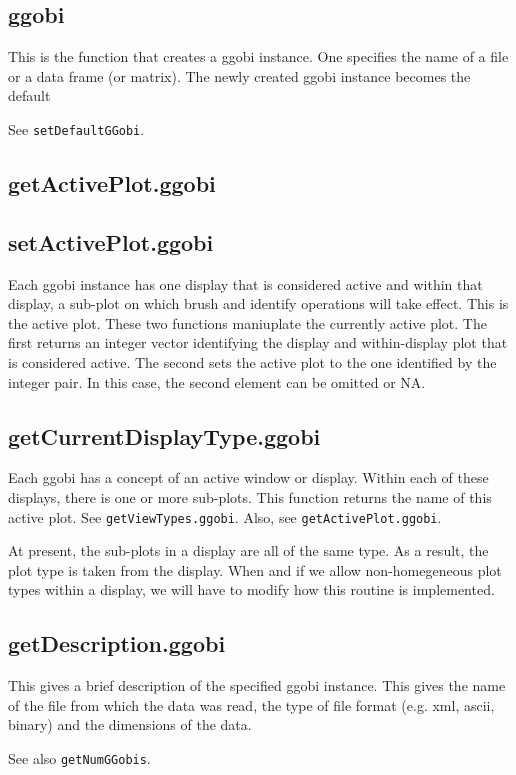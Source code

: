 \documentclass{article}
\def\SFunction#1{{\texttt{\red #1}}}
\begin{document}
\subsection{ggobi}
This is the function that creates a ggobi instance.
One specifies the name of a file or a data frame (or matrix).
The newly created ggobi instance becomes the default

See \SFunction{setDefaultGGobi}.


\subsection{getActivePlot.ggobi}
\subsection{setActivePlot.ggobi}
Each ggobi instance has one display that is considered active and
within that display, a sub-plot on which brush and identify operations
will take effect.  This is the active plot.  These two functions
maniuplate the currently active plot.  The first returns an integer
vector identifying the display and within-display plot that is
considered active.  The second sets the active plot to the one
identified by the integer pair.  In this case, the second element can
be omitted or NA.


\subsection{getCurrentDisplayType.ggobi}
Each ggobi has a concept of an active window or display. Within each
of these displays, there is one or more sub-plots.  This function
returns the name of this active plot.  See
\SFunction{getViewTypes.ggobi}.  Also, see
\SFunction{getActivePlot.ggobi}.

At present, the sub-plots in a display are all of the same type. As a
result, the plot type is taken from the display.  When and if we allow
non-homegeneous plot types within a display, we will have to modify
how this routine is implemented.

\subsection{getDescription.ggobi}
This gives a brief description of the specified ggobi instance.  This
gives the name of the file from which the data was read, the type of
file format (e.g. xml, ascii, binary) and the dimensions of the data.

See also \SFunction{getNumGGobis}.
\end{document}
